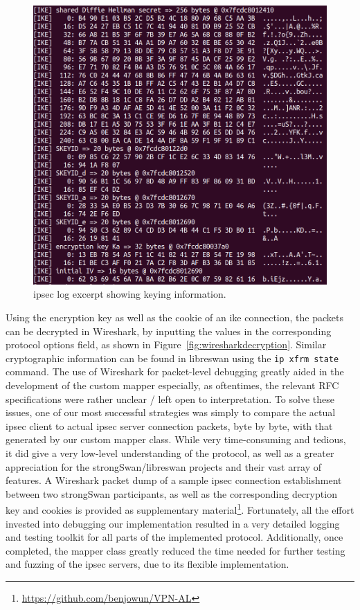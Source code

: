\begin{figure}[h]
	\centering
	\includegraphics[width=0.7\linewidth]{images/key_material_log}
	\caption{\ac{ipsec} log excerpt showing keying information.}
	\label{fig:keymateriallog}
\end{figure}
\newpage

Using the encryption key as well as the cookie of an \ac{ike} connection, the packets can be decrypted in Wireshark, by inputting the values in the corresponding protocol options field, as shown in Figure~\ref{fig:wiresharkdecryption}. Similar cryptographic information can be found in libreswan using the \texttt{ip xfrm state} command. The use of Wireshark for packet-level debugging greatly aided in the development of the custom mapper especially, as oftentimes, the relevant RFC specifications were rather unclear / left open to interpretation. To solve these issues, one of our most successful strategies was simply to compare the actual \ac{ipsec} client to actual \ac{ipsec} server connection packets, byte by byte, with that generated by our custom mapper class. While very time-consuming and tedious, it did give a very low-level understanding of the protocol, as well as a greater appreciation for the strongSwan/libreswan projects and their vast array of features. A Wireshark packet dump of a sample \ac{ipsec} connection establishment between two strongSwan participants, as well as the corresponding decryption key and cookies is provided as supplementary material\footnote{\url{https://github.com/benjowun/VPN-AL}}. Fortunately, all the effort invested into debugging our implementation resulted in a very detailed logging and testing toolkit for all parts of the implemented protocol. Additionally, once completed, the mapper class greatly reduced the time needed for further testing and fuzzing of the \ac{ipsec} servers, due to its flexible implementation.

